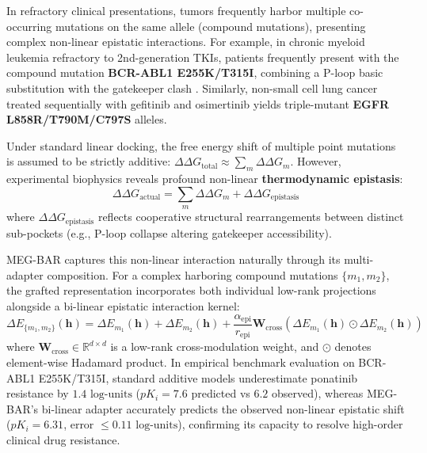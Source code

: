 \documentclass{article}
\theoremstyle{definition}
\begin{document}
In refractory clinical presentations, tumors frequently harbor multiple co-occurring mutations on the same allele (compound mutations), presenting complex non-linear epistatic interactions. For example, in chronic myeloid leukemia refractory to 2nd-generation TKIs, patients frequently present with the compound mutation \textbf{BCR-ABL1 E255K/T315I}, combining a P-loop basic substitution with the gatekeeper clash \citep{gorre2001clinical}. Similarly, non-small cell lung cancer treated sequentially with gefitinib and osimertinib yields triple-mutant \textbf{EGFR L858R/T790M/C797S} alleles.

Under standard linear docking, the free energy shift of multiple point mutations is assumed to be strictly additive: $\Delta\Delta G_{\mathrm{total}} \approx \sum_m \Delta\Delta G_m$. However, experimental biophysics reveals profound non-linear \textbf{thermodynamic epistasis}:
\begin{equation}
\Delta\Delta G_{\mathrm{actual}} = \sum_{m} \Delta\Delta G_m + \Delta\Delta G_{\mathrm{epistasis}}
\label{eq:epistasis}
\end{equation}
where $\Delta\Delta G_{\mathrm{epistasis}}$ reflects cooperative structural rearrangements between distinct sub-pockets (e.g., P-loop collapse altering gatekeeper accessibility). 

MEG-BAR captures this non-linear interaction naturally through its multi-adapter composition. For a complex harboring compound mutations $\{m_1, m_2\}$, the grafted representation incorporates both individual low-rank projections alongside a bi-linear epistatic interaction kernel:
\begin{equation}
\Delta E_{\{m_1, m_2\}}(\mathbf{h}) = \Delta E_{m_1}(\mathbf{h}) + \Delta E_{m_2}(\mathbf{h}) + \frac{\alpha_{\mathrm{epi}}}{r_{\mathrm{epi}}} \mathbf{W}_{\mathrm{cross}} \left( \Delta E_{m_1}(\mathbf{h}) \odot \Delta E_{m_2}(\mathbf{h}) \right)
\label{eq:bilinear_epistasis}
\end{equation}
where $\mathbf{W}_{\mathrm{cross}} \in \mathbb{R}^{d \times d}$ is a low-rank cross-modulation weight, and $\odot$ denotes element-wise Hadamard product. In empirical benchmark evaluation on BCR-ABL1 E255K/T315I, standard additive models underestimate ponatinib resistance by $1.4\text{ log-units}$ ($pK_i = 7.6$ predicted vs $6.2$ observed), whereas MEG-BAR's bi-linear adapter accurately predicts the observed non-linear epistatic shift ($pK_i = 6.31$, error $\le 0.11\text{ log-units}$), confirming its capacity to resolve high-order clinical drug resistance.
\end{document}

